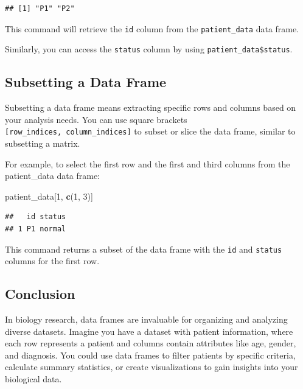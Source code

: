\documentclass[
]{book}
\newenvironment{Shaded}{\begin{snugshade}}{\end{snugshade}}
\newcommand{\DecValTok}[1]{\textcolor[rgb]{0.00,0.00,0.81}{#1}}
\newcommand{\FunctionTok}[1]{\textcolor[rgb]{0.13,0.29,0.53}{\textbf{#1}}}
\newcommand{\NormalTok}[1]{#1}
\begin{document}
\begin{verbatim}
## [1] "P1" "P2"
\end{verbatim}

This command will retrieve the \texttt{id} column from the \texttt{patient\_data} data frame.

Similarly, you can access the \texttt{status} column by using \texttt{patient\_data\$status}.

\hypertarget{subsetting-a-data-frame}{%
\subsection{Subsetting a Data Frame}\label{subsetting-a-data-frame}}

Subsetting a data frame means extracting specific rows and columns based on your analysis needs. You can use square brackets \texttt{{[}row\_indices,\ column\_indices{]}} to subset or slice the data frame, similar to subsetting a matrix.

For example, to select the first row and the first and third columns from the patient\_data data frame:

\begin{Shaded}
\begin{Highlighting}[]
\NormalTok{patient\_data[}\DecValTok{1}\NormalTok{, }\FunctionTok{c}\NormalTok{(}\DecValTok{1}\NormalTok{, }\DecValTok{3}\NormalTok{)]}
\end{Highlighting}
\end{Shaded}

\begin{verbatim}
##   id status
## 1 P1 normal
\end{verbatim}

This command returns a subset of the data frame with the \texttt{id} and \texttt{status} columns for the first row.

\hypertarget{conclusion-16}{%
\subsection{Conclusion}\label{conclusion-16}}

In biology research, data frames are invaluable for organizing and analyzing diverse datasets. Imagine you have a dataset with patient information, where each row represents a patient and columns contain attributes like age, gender, and diagnosis. You could use data frames to filter patients by specific criteria, calculate summary statistics, or create visualizations to gain insights into your biological data.
\end{document}
